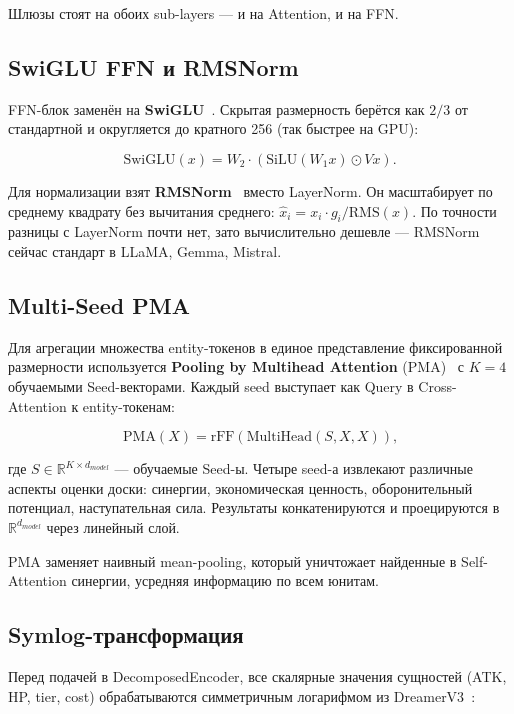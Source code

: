 \documentclass[a4paper,12pt]{extarticle}
\begin{document}
Шлюзы стоят на обоих sub-layers --- и на Attention, и на FFN.

\subsection{SwiGLU FFN и RMSNorm}

FFN-блок заменён на \textbf{SwiGLU}~\cite{swiglu}. Скрытая размерность берётся как $2/3$ от стандартной и округляется до кратного 256 (так быстрее на GPU):

\begin{equation}
\text{SwiGLU}(x) = W_2 \cdot (\text{SiLU}(W_1 x) \odot V x)\text{.}
\end{equation}

Для нормализации взят \textbf{RMSNorm}~\cite{rmsnorm} вместо LayerNorm. Он масштабирует по среднему квадрату без вычитания среднего: $\hat{x}_i = x_i \cdot g_i / \text{RMS}(x)$. По точности разницы с LayerNorm почти нет, зато вычислительно дешевле --- RMSNorm сейчас стандарт в LLaMA, Gemma, Mistral.

\subsection{Multi-Seed PMA}

Для агрегации множества entity-токенов в единое представление фиксированной размерности используется \textbf{Pooling by Multihead Attention} (PMA)~\cite{set_transformer} с $K=4$ обучаемыми Seed-векторами. Каждый seed выступает как Query в Cross-Attention к entity-токенам:

$$\text{PMA}(X) = \text{rFF}\left(\text{MultiHead}(S, X, X)\right)\text{,}$$

где $S \in \mathbb{R}^{K \times d_{model}}$ --- обучаемые Seed-ы. Четыре seed-а извлекают различные аспекты оценки доски: синергии, экономическая ценность, оборонительный потенциал, наступательная сила. Результаты конкатенируются и проецируются в $\mathbb{R}^{d_{model}}$ через линейный слой.

PMA заменяет наивный mean-pooling, который уничтожает найденные в Self-Attention синергии, усредняя информацию по всем юнитам.

\subsection{Symlog-трансформация}

Перед подачей в DecomposedEncoder, все скалярные значения сущностей (ATK, HP, tier, cost) обрабатываются симметричным логарифмом из DreamerV3~\cite{dreamerv3}:
\end{document}
